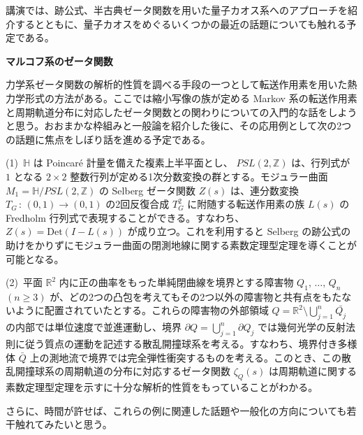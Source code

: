 \documentclass[uplatex,dvipdfmx]{jlreq}
\begin{document}
講演では、跡公式、半古典ゼータ関数を用いた量子カオス系へのアプローチを紹介するとともに、量子カオスをめぐるいくつかの最近の話題についても触れる予定である。

\newpage

\begin{center}
{\large\bfseries マルコフ系のゼータ関数}\\[6pt]
\hspace*{\fill}{\large\bfseries 盛田　健彦（広島大学・大学院理学研究科）}
\end{center}

力学系ゼータ関数の解析的性質を調べる手段の一つとして転送作用素を用いた熱力学形式の方法がある。ここでは縮小写像の族が定める Markov 系の転送作用素と周期軌道分布に対応したゼータ関数との関わりについての入門的な話をしようと思う。おおまかな枠組みと一般論を紹介した後に、その応用例として次の2つの話題に焦点をしぼり話を進める予定である。

\medskip
(1)\ $\mathbb{H}$ は Poincaré 計量を備えた複素上半平面とし、
$PSL(2,\mathbb{Z})$ は、行列式が $1$ となる $2\times2$ 整数行列が定める1次分数変換の群とする。モジュラー曲面 $M_{1}=\mathbb{H}/PSL(2,\mathbb{Z})$ の Selberg ゼータ関数 $Z(s)$ は、連分数変換 $T_{G}\,:\, (0,1)\to (0,1)$ の2回反復合成 $T_{G}^{2}$ に附随する転送作用素の族 $L(s)$ の Fredholm 行列式で表現することができる。すなわち、$Z(s)=\mathrm{Det}(I-L(s))$ が成り立つ。これを利用すると Selberg の跡公式の助けをかりずにモジュラー曲面の閉測地線に関する素数定理型定理を導くことが可能となる。

\medskip
(2)\ 平面 $\mathbb{R}^{2}$ 内に正の曲率をもった単純閉曲線を境界とする障害物
$Q_{1},\,\dots,\, Q_{n}$ $(n\ge3)$ が、どの2つの凸包を考えてもその2つ以外の障害物と共有点をもたないように配置されていたとする。これらの障害物の外部領域 $Q=\mathbb{R}^{2}\setminus\bigcup_{j=1}^{n}\bar{Q_{j}}$ の内部では単位速度で並進運動し、境界 $\partial Q=\bigcup_{j=1}^{n}\partial Q_{j}$ では幾何光学の反射法則に従う質点の運動を記述する散乱開撞球系を考える。すなわち、境界付き多様体 $\bar{Q}$ 上の測地流で境界では完全弾性衝突するものを考える。このとき、この散乱開撞球系の周期軌道の分布に対応するゼータ関数 $\zeta_{Q}(s)$ は周期軌道に関する素数定理型定理を示すに十分な解析的性質をもっていることがわかる。

\medskip
さらに、時間が許せば、これらの例に関連した話題や一般化の方向についても若干触れてみたいと思う。
\end{document}
